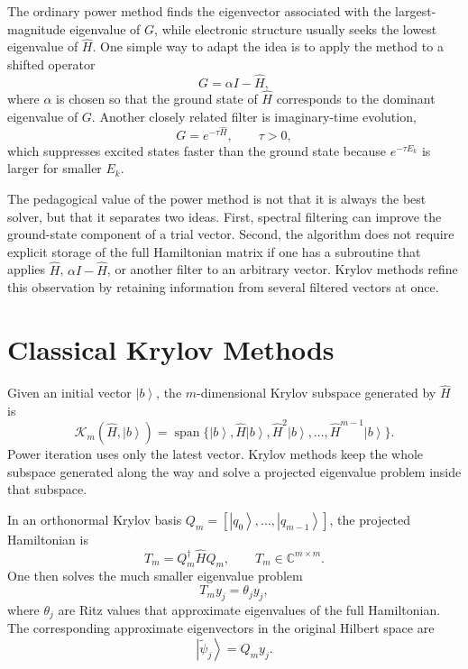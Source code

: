 \documentclass[11pt]{article}
\newcommand{\ket}[1]{\left|#1\right\rangle}
\begin{document}
The ordinary power method finds the eigenvector associated with the largest-magnitude eigenvalue of $G$, while electronic structure usually seeks the lowest eigenvalue of $\hat{H}$.  One simple way to adapt the idea is to apply the method to a shifted operator
\begin{equation}
    G = \alpha I - \hat{H},
\end{equation}
where $\alpha$ is chosen so that the ground state of $\hat{H}$ corresponds to the dominant eigenvalue of $G$.  Another closely related filter is imaginary-time evolution,
\begin{equation}
    G = e^{-\tau \hat{H}},\qquad \tau>0,
\end{equation}
which suppresses excited states faster than the ground state because $e^{-\tau E_k}$ is larger for smaller $E_k$.

The pedagogical value of the power method is not that it is always the best solver, but that it separates two ideas.  First, spectral filtering can improve the ground-state component of a trial vector.  Second, the algorithm does not require explicit storage of the full Hamiltonian matrix if one has a subroutine that applies $\hat{H}$, $\alpha I-\hat{H}$, or another filter to an arbitrary vector.  Krylov methods refine this observation by retaining information from several filtered vectors at once.

\section{Classical Krylov Methods}

Given an initial vector $\ket{b}$, the $m$-dimensional Krylov subspace generated by $\hat{H}$ is
\begin{equation}
    \mathcal{K}_m(\hat{H},\ket{b})
    = \operatorname{span}\{\ket{b},\hat{H}\ket{b},\hat{H}^2\ket{b},\ldots,\hat{H}^{m-1}\ket{b}\}.
    \label{eq:krylov_subspace}
\end{equation}
Power iteration uses only the latest vector.  Krylov methods keep the whole subspace generated along the way and solve a projected eigenvalue problem inside that subspace.

In an orthonormal Krylov basis $Q_m=[\ket{q_0},\ldots,\ket{q_{m-1}}]$, the projected Hamiltonian is
\begin{equation}
    T_m = Q_m^\dagger \hat{H} Q_m,
    \qquad T_m\in\mathbb{C}^{m\times m}.
\end{equation}
One then solves the much smaller eigenvalue problem
\begin{equation}
    T_m y_j = \theta_j y_j,
\end{equation}
where $\theta_j$ are Ritz values that approximate eigenvalues of the full Hamiltonian.  The corresponding approximate eigenvectors in the original Hilbert space are
\begin{equation}
    \ket{\tilde{\psi}_j}=Q_m y_j.
\end{equation}
\end{document}
